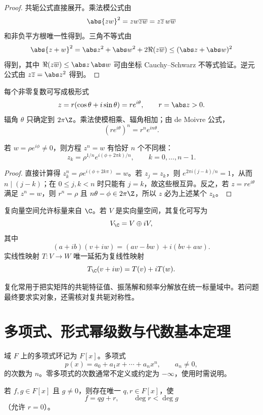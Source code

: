\begin{proof}
共轭公式直接展开。乘法模公式由
\[
 \abs{zw}^2=zw\overline{zw}
 =z\overline z\,w\overline w
\]
和非负平方根唯一性得到。三角不等式由
\[
 \abs{z+w}^2
 =\abs z^2+\abs w^2+2\Re(z\overline w)
 \le(\abs z+\abs w)^2
\]
得到，其中 \(\Re(z\overline w)\le\abs z\,\abs w\) 可由坐标 Cauchy--Schwarz 不等式验证。逆元公式由 \(z\overline z=\abs z^2\) 得到。
\end{proof}

每个非零复数可写成极形式
\[
 z=r(\cos\theta+i\sin\theta)=re^{i\theta},
\qquad r=\abs z>0.
\]
辐角 \(\theta\) 只确定到 \(2\pi\Z\)。乘法使模相乘、辐角相加；由 de Moivre 公式，
\[
 (re^{i\theta})^n=r^ne^{in\theta}.
\]

\begin{proposition}[复数的 \(n\) 次根]
若 \(w=\rho e^{i\phi}\ne0\)，则方程 \(z^n=w\) 有恰好 \(n\) 个不同根：
\[
 z_k=\rho^{1/n}
 e^{i(\phi+2\pi k)/n},
 \qquad k=0,\ldots,n-1.
\]
\end{proposition}

\begin{proof}
直接计算得 \(z_k^n=\rho e^{i(\phi+2k\pi)}=w\)。若 \(z_j=z_k\)，则
\(e^{2\pi i(j-k)/n}=1\)，从而 \(n\mid(j-k)\)；在 \(0\le j,k<n\) 时只能有 \(j=k\)，故这些根互异。反之，若 \(z=re^{i\theta}\) 满足 \(z^n=w\)，则 \(r^n=\rho\) 且 \(n\theta-\phi\in2\pi\Z\)，所以 \(z\) 必为上述某个 \(z_k\)。
\end{proof}

\begin{definition}[复向量空间与复化]
复向量空间允许标量来自 \(\C\)。若 \(V\) 是实向量空间，其复化可写为
\[
 V_\C=V\oplus iV,
\]
其中
\[
 (a+ib)(v+iw)=(av-bw)+i(bv+aw).
\]
实线性映射 \(T:V\to W\) 唯一延拓为复线性映射
\[
 T_\C(v+iw)=T(v)+iT(w).
\]
\end{definition}

复化常用于把实矩阵的共轭特征值、振荡解和频率分解放在统一标量域中。若问题最终要求实对象，还需核对复共轭对称性。

\section{多项式、形式幂级数与代数基本定理}

域 \(F\) 上的多项式环记为 \(F[x]\)。多项式
\[
 p(x)=a_0+a_1x+\cdots+a_nx^n,\qquad a_n\ne0,
\]
的次数为 \(n\)。零多项式的次数通常不定义或约定为 \(-\infty\)，使用时需说明。

\begin{theorem}[带余除法]
若 \(f,g\in F[x]\) 且 \(g\ne0\)，则存在唯一 \(q,r\in F[x]\)，使
\[
 f=qg+r,\qquad \deg r<\deg g
\]
（允许 \(r=0\)）。
\end{theorem}

